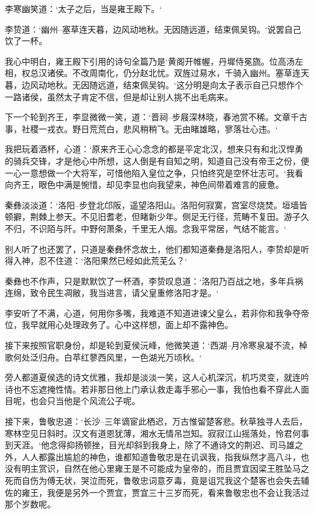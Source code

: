 李寒幽笑道：‘太子之后，当是雍王殿下。‘

李贽道：‘幽州--塞草连天暮，边风动地秋。无因随远道，结束佩吴钩。‘说罢自己饮了一杯。

我心中明白，雍王殿下引用的诗句全篇乃是‘黄阁开帷幄，丹墀侍冕旒。位高汤左相，权总汉诸侯。不改周南化，仍分赵北忧。双旌过易水，千骑入幽州。塞草连天暮，边风动地秋。无因随远道，结束佩吴钩。‘这分明是向太子表示自己只想作个一路诸侯，虽然太子肯定不信，但是却让别人挑不出毛病来。

下一个轮到齐王，李显微微一笑，道：‘晋祠--步屐深林晓，春池赏不稀。文章千古事，社稷一戎衣。野日荒荒白，悲风稍稍飞。无由睹雄略，寥落壮心违。‘

我把玩着酒杯，心道：‘原来齐王心心念念的都是平定北汉，想来只有和北汉悍勇的骑兵交锋，才是他心中所想，这人倒是有自知之明，知道自己没有帝王之份，便一心一意想做一个大将军，可惜他陷入皇位之争，只怕终究是空怀壮志可。‘我看向齐王，眼色中满是惋惜，却见李显也向我望来，神色间带着难言的疲惫。

秦彝淡淡道：‘洛阳--步登北邙阪，遥望洛阳山。洛阳何寂寞，宫室尽烧焚。垣墙皆顿擗，荆棘上参天。不见旧耆老，但睹新少年。侧足无行径，荒畴不复田。游子久不归，不识陌与阡。中野何萧条，千里无人烟。念我平常居，气结不能言。‘

别人听了也还罢了，只道是秦彝怀念故土，他们都知道秦彝是洛阳人，李贽却是听得入神，忍不住道：‘洛阳果然已经如此荒芜么？‘

秦彝也不作声，只是默默饮了一杯酒，李贽叹息道：‘洛阳乃百战之地，多年兵祸连绵，致令民生凋敝，我当进言，请父皇重修洛阳才是。‘

李安听了不满，心道，何用你多嘴，我难道不知道进谏父皇么，若非你和我争夺帝位，我早就用心处理政务了。心中这样想，面上却不露神色。

接下来按照官职身份，却是轮到夏侯沅峰，他微笑道：‘西湖--月冷寒泉凝不流，棹歌何处泛归舟。白苹红蓼西风里，一色湖光万顷秋。‘

旁人都道夏侯选的诗文优雅，我却是淡淡一笑，这人心机深沉，机巧灵变，就连吟诗也不忘遮掩性情。若非那日他上门承认救走毒手邪心一事，我怕也看不穿此人面目呢，也会只当他是个风流公子呢。

接下来，鲁敬忠道：‘长沙--三年谪宦此栖迟，万古惟留楚客悲。秋草独寻人去后，寒林空见日斜时。汉文有道恩犹薄，湘水无情吊岂知。寂寂江山摇落处，怜君何事到天涯。‘他念得抑扬顿挫，目光却斜到我身上，除了不通诗文的荆迟、司马雄之外，人人都露出尴尬的神色，谁都知道鲁敬忠是在讥讽我，指我纵然才高八斗，也没有明主赏识，自然在他心里雍王是不可能成为皇帝的，而且贾宜因梁王胜坠马之死而自伤为傅无状，哭泣而死，鲁敬忠词意歹毒，竟是诅咒我这个楚客也会失去辅佐的雍王，我便是另外一个贾宜，贾宜三十三岁而死，看来鲁敬忠也不会让我活过那个岁数呢。

